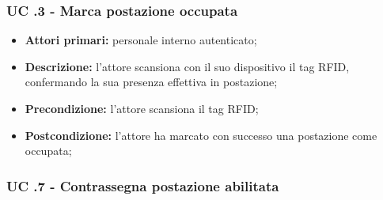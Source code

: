 \newpage

\subsubsection{UC .3 - Marca postazione occupata}

\begin{itemize}
\item \textbf{Attori primari:} personale interno autenticato;
\item \textbf{Descrizione:} l'attore scansiona con il suo dispositivo il tag RFID, confermando la sua presenza effettiva in postazione;
\item \textbf{Precondizione:} l'attore scansiona il tag RFID;
\item \textbf{Postcondizione:} l'attore ha marcato con successo una postazione come occupata;
\end{itemize}



\subsubsection{UC .7 - Contrassegna postazione abilitata}

